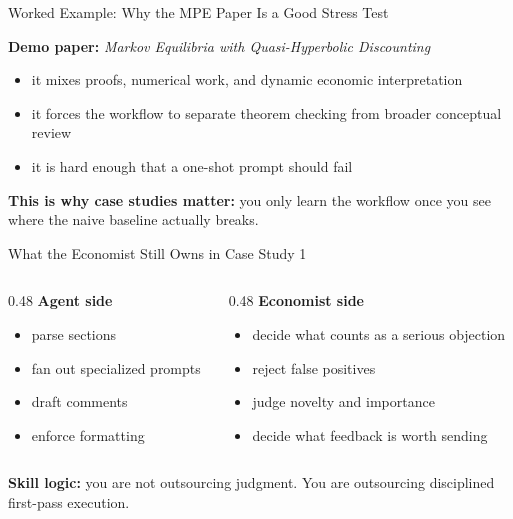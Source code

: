 \documentclass[10pt,english,aspectratio=169]{beamer}
\begin{document}
\begin{frame}{Worked Example: Why the MPE Paper Is a Good Stress Test}
\begin{tcolorbox}[colback=blue!3, colframe=RedTitle!60]
\textbf{Demo paper:} \textit{Markov Equilibria with Quasi-Hyperbolic Discounting}
\end{tcolorbox}

\vspace{0.25cm}
\begin{itemize}
    \item it mixes proofs, numerical work, and dynamic economic interpretation
    \item it forces the workflow to separate theorem checking from broader conceptual review
    \item it is hard enough that a one-shot prompt should fail
\end{itemize}

\vspace{0.3cm}
\textbf{This is why case studies matter:} you only learn the workflow once you see where the naive baseline actually breaks.
\end{frame}

\begin{frame}{What the Economist Still Owns in Case Study 1}
\begin{columns}[T]
\begin{column}{0.48\textwidth}
\textbf{Agent side}
\begin{itemize}
    \item parse sections
    \item fan out specialized prompts
    \item draft comments
    \item enforce formatting
\end{itemize}
\end{column}
\begin{column}{0.48\textwidth}
\textbf{Economist side}
\begin{itemize}
    \item decide what counts as a serious objection
    \item reject false positives
    \item judge novelty and importance
    \item decide what feedback is worth sending
\end{itemize}
\end{column}
\end{columns}

\vspace{0.3cm}
\textbf{Skill logic:} you are not outsourcing judgment. You are outsourcing disciplined first-pass execution.
\end{frame}
\end{document}
